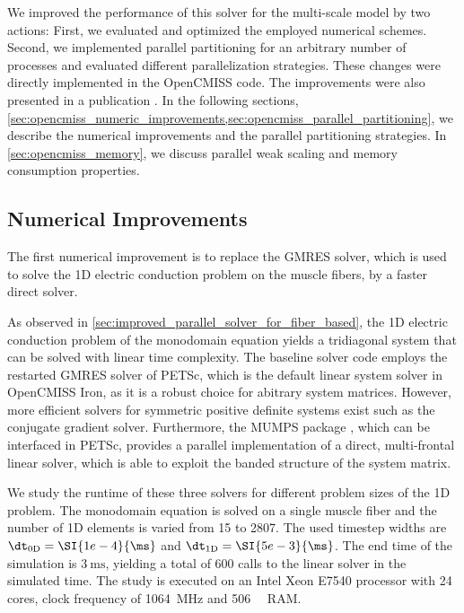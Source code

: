 We improved the performance of this solver for the multi-scale model by two actions: First, we evaluated and optimized the employed numerical schemes. Second, we implemented parallel partitioning for an arbitrary number of processes and evaluated different parallelization strategies.
These changes were directly implemented in the OpenCMISS code. The improvements were also presented in a publication \cite{Bradley:2018:EDB}. In the following sections, \cref{sec:opencmiss_numeric_improvements,sec:opencmiss_parallel_partitioning}, we describe the numerical improvements and the parallel partitioning strategies. In \cref{sec:opencmiss_memory}, we discuss parallel weak scaling and memory consumption properties.

\subsection{Numerical Improvements}\label{sec:opencmiss_numeric_improvements}

The first numerical improvement is to replace the GMRES solver, which is used to solve the 1D electric conduction problem on the muscle fibers,
by a faster direct solver. 

As observed in \cref{sec:improved_parallel_solver_for_fiber_based}, the 1D electric conduction problem of the monodomain equation yields a tridiagonal system that can be solved with linear time complexity. The baseline solver code employs the restarted GMRES solver of PETSc, which is the default linear system solver in OpenCMISS Iron, as it is a robust choice for abitrary system matrices. 
However, more efficient solvers for symmetric positive definite systems exist such as the conjugate gradient solver. 
Furthermore, the MUMPS package \cite{mumps2001}, which can be interfaced in PETSc, provides a parallel implementation of a direct, multi-frontal linear solver, which is able to exploit the banded structure of the system matrix.

We study the runtime of these three solvers for different problem sizes of the 1D problem. The monodomain equation is solved on a single muscle fiber and the number of 1D elements is varied from 15 to 2807. The used timestep widths are $\dt_\text{0D}=\SI{1e-4}{\ms}$ and $\dt_\text{1D}=\SI{5e-3}{\ms}$. The end time of the simulation is $\SI{3}{\ms}$, yielding a total of 600 calls to the linear solver in the simulated time. The study is executed on an Intel Xeon E7540 processor with 24 cores, clock frequency of \SI{1064}{\mega\hertz} and \SI{506}{\gibi\byte} RAM.

